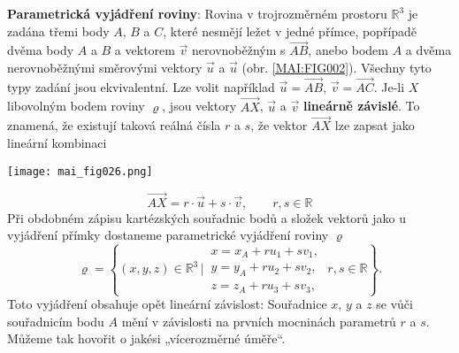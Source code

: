 \wikitextrule
\begin{example}\label{mai:exam004}
  \textbf{Parametrická vyjádření roviny}:\newline\small
  Rovina v trojrozměrném prostoru \(\mathbb{R}^3\) je zadána třemi body \(A\), \(B\) a \(C\), 
  které nesmějí ležet v jedné přímce, popřípadě dvěma body \(A\) a \(B\) a vektorem \(\vec{v}\) 
  nerovnoběžným s \(\overrightarrow{AB}\), anebo bodem \(A\) a dvěma nerovnoběžnými směrovými 
  vektory \(\vec{u}\) a \(\vec{u}\) (obr. \ref{MAI:FIG002}). Všechny tyto typy zadání jsou 
  ekvivalentní. Lze volit například \(\vec{u} = \overrightarrow{AB}\), \(\vec{v} = 
  \overrightarrow{AC}\). Je-li \(X\) libovolným bodem roviny \(\varrho\), jsou vektory 
  \(\overrightarrow{AX}\), \(\vec{u}\) a \(\vec{v}\) \textbf{lineárně závislé}. To znamená, že 
  existují taková reálná čísla \(r\) a \(s\), že vektor \(\overrightarrow{AX}\) lze zapsat jako 
  lineární kombinaci

  {\centering
    \captionsetup{type=figure}
    \texttt{[image: mai\_fig026.png]}
    \par}
  
  \begin{equation*}
    \overrightarrow{AX} = r\cdot\vec{u} + s\cdot\vec{v}, \qquad r,s \in\mathbb{R}
  \end{equation*}
  Při obdobném zápisu kartézských souřadnic bodů a složek vektorů jako u vyjádření přímky dostaneme
  parametrické vyjádření roviny \(\varrho\)
  \begin{equation}\label{mai:eq039}
    \varrho = \left\{(x,y,z)\in\mathbb{R}^3\,|\,
    \begin{matrix}
      x = x_A + ru_1 + sv_1,        \\
      y = y_A + ru_2 + sv_2,        \\
      z = z_A + ru_3 + sv_3,
    \end{matrix}
    \;r,s\in\mathbb{R}
    \right\}.
  \end{equation}
  Toto vyjádření obsahuje opět lineární závislost: Souřadnice \(x\), \(y\) a \(z\) se vůči 
  souřadnicím bodu \(A\) mění v závislosti na prvních mocninách parametrů \(r\) a \(s\). Můžeme tak 
  hovořit o jakési „vícerozměrné úměře“.
  \normalsize
\end{example}
  